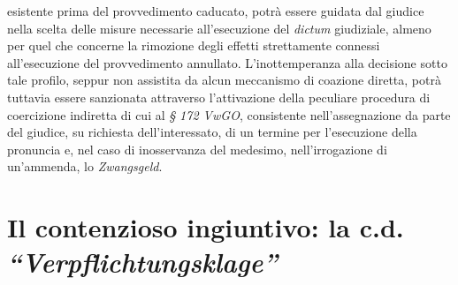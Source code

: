 \documentclass[12pt,it,a4paper,]{report}
\begin{document}
esistente prima del provvedimento caducato, potrà essere guidata dal
giudice nella scelta delle misure necessarie all'esecuzione del
\emph{dictum} giudiziale, almeno per quel che concerne la rimozione
degli effetti strettamente connessi all'esecuzione del provvedimento
annullato. L'inottemperanza alla decisione sotto tale profilo, seppur
non assistita da alcun meccanismo di coazione diretta, potrà tuttavia
essere sanzionata attraverso l'attivazione della peculiare procedura di
coercizione indiretta di cui al \emph{§ 172 VwGO}, consistente
nell'assegnazione da parte del giudice, su richiesta dell'interessato,
di un termine per l'esecuzione della pronuncia e, nel caso di
inosservanza del medesimo, nell'irrogazione di un'ammenda, lo
\emph{Zwangsgeld}.

\hypertarget{il-contenzioso-ingiuntivo-la-c.d.-verpflichtungsklage}{%
\section{\texorpdfstring{Il contenzioso ingiuntivo: la c.d.
\emph{``Verpflichtungsklage''}}{Il contenzioso ingiuntivo: la c.d. ``Verpflichtungsklage''}}\label{il-contenzioso-ingiuntivo-la-c.d.-verpflichtungsklage}}
\end{document}
